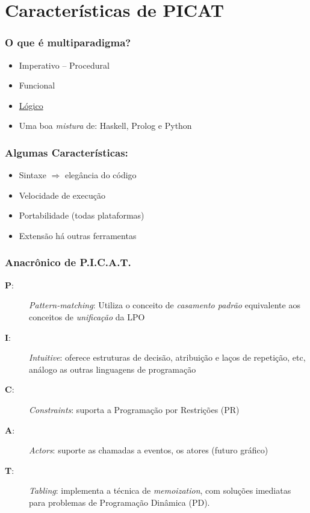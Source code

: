 \documentclass[brazil]{beamer}
\begin{document}
\section{Características de PICAT}

\begin{frame}
    \frametitle{O que é multiparadigma?}

    \begin{itemize}
      \item Imperativo -- Procedural
      \item Funcional
      \item \underline{Lógico}
      \item Uma boa \textit{mistura} de: Haskell, Prolog e Python

    \end{itemize}

\end{frame}
\begin{frame}
    \frametitle{Algumas Características:}

    \begin{itemize}
    
      \item Sintaxe $\Rightarrow $ elegância do código
      \item Velocidade de execução
      \item Portabilidade (todas plataformas)
      \item Extensão há outras ferramentas
      
    \end{itemize}
\end{frame}
\begin{frame}
    \frametitle{Anacrônico de \textbf{P.I.C.A.T.}}
  
 \begin{description}
   
 
 \item [\textbf{P}:] \textit{Pattern-matching}:  Utiliza o conceito de \textit{casamento padrão}
 equivalente aos conceitos de \textit{unificação} da LPO
 
 \item [\textbf{I}:] \textit{Intuitive}: oferece estruturas de decisão, atribuição e 
 laços de repetição, etc, análogo as outras linguagens de programação
\item [\textbf{C}:] \textit{Constraints}: suporta a Programação por Restrições (PR)
 
     \item [\textbf{A}:] \textit{Actors}: suporte as chamadas a eventos, os atores (futuro gráfico) 
 
  \item [\textbf{T}:] \textit{Tabling}: implementa a técnica de \textit{memoization}, com soluções imediatas para problemas de Programação Dinâmica (PD).
   
  
\end{description}
\end{frame}
\end{document}

